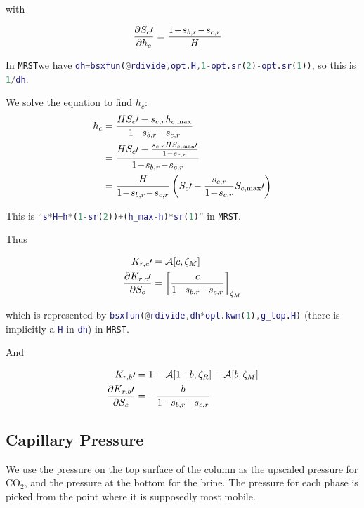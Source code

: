 \documentclass[12pt]{scrartcl}
\newcommand{\mth}[1]{\ensuremath{#1}\xspace}
\newcommand{\COO}{\mth{\mathrm{CO}_2}}
\newcommand{\MRST}{{\tt MRST}}
\newcommand{\aleft}{\mathopen{}\mathclose\bgroup\left}  %
\newcommand{\aright}{\aftergroup\egroup\right}          %
\newcommand{\binop}[3]{#1\mkern1mu{#2}\mkern1mu #3}     %
\newcommand{\dual}[1]{\binop{1}{-}{#1}}                 %
\newcommand{\ddual}[2]{\binop{\binop{1}{-}{#1}}{-}{#2}} %
\newcommand{\at}[2]{\left[ #1 \right]_{#2}}             %
\newcommand{\der}[2]{\frac{\partial{#1}}{\partial{#2}}}       %
\newcommand{\Hei}{H}        %
\newcommand{\hei}{h}        %
\newcommand{\Sat}{S}        %
\newcommand{\sat}{s}        %
\newcommand{\sr}[1]{\sat_{#1,r}}    %
\newcommand{\Rlp}[1]{K_{r,#1}}  %
\newcommand{\Lev}{\zeta}    %
\newcommand{\Res}{R}        %
\newcommand{\Mob}{M}        %
\newcommand{\nap}{c}        %
\newcommand{\wet}{b}        %
\newcommand{\avg}[2]{\mathcal{A}\aleft[#1, #2\aright]}  %
\newcommand{\krnwr}{c}      %
\newcommand{\krwnr}{b}      %
\newcommand{\Satn}{\Sat_\nap}
\newcommand{\Satnmax}{\Sat_{\nap,\max}} %
\newcommand{\snr}{\sr{\nap}}    %
\newcommand{\swr}{\sr{\wet}}    %
\newcommand{\LevM}{\Lev_\Mob}
\newcommand{\LevR}{\Lev_\Res}
\newcommand{\hnap}{\hei_\nap}           %
\newcommand{\hnmax}{\hei_{\nap,\max}}   %
\newcommand{\Rlpn}{\Rlp{\nap}}  %
\newcommand{\Rlpw}{\Rlp{\wet}}  %
\begin{document}
with

\begin{align}
\der{ \Satn \prime }{ \hnap } &= \frac{ \ddual{ \swr }{ \snr } }{ \Hei }
\end{align}

In \MRST we have \lstinline[language=Matlab]!dh=bsxfun(@rdivide,opt.H,1-opt.sr(2)-opt.sr(1))!, so this is \lstinline[language=Matlab]!1/dh!.

We solve the equation to find \( \hnap \):
\begin{align}
\hnap &= \frac{ \Hei \Satn \prime - \snr \hnmax }{ \ddual{ \swr }{ \snr } } \\
&= \frac{ \Hei \Satn \prime - \frac{ \snr \Hei \Satnmax \prime }{ \dual{ \snr } } }{ \ddual{ \swr }{ \snr } } \\
&= \frac{ \Hei }{ \ddual{ \swr }{ \snr } } \left( \Satn \prime - \frac{ \snr }{ \dual{ \snr } } \Satnmax \prime \right)
\end{align}

This is ``\lstinline[language=Matlab]!s*H=h*(1-sr(2))+(h_max-h)*sr(1)!'' in \MRST.

Thus

\begin{align}
\Rlpn \prime &= \avg{ \krnwr }{ \LevM } \\
\der{ \Rlpn \prime }{ \Satn } &= \at{ \frac{ \krnwr }{ \ddual{ \swr }{ \snr } } }{ \LevM }
\end{align}

which is represented by \lstinline[language=Matlab]!bsxfun(@rdivide,dh*opt.kwm(1),g_top.H)! (there is implicitly a \lstinline[language=Matlab]!H! in \lstinline[language=Matlab]!dh!) in \MRST.

And

\begin{align}
\Rlpw \prime &= 1 - \avg{ \dual{ \krwnr } }{ \LevR } - \avg{ \krwnr }{ \LevM } \\
\der{ \Rlpw \prime }{ \Satn } &= - \frac{ \krwnr }{ \ddual{ \swr }{ \snr } }
\end{align}

\subsection{Capillary Pressure}
We use the pressure on the top surface of the column as the upscaled pressure for \COO, and the pressure at the bottom for the brine. The pressure for each phase is picked from the point where it is supposedly most mobile.
\end{document}
